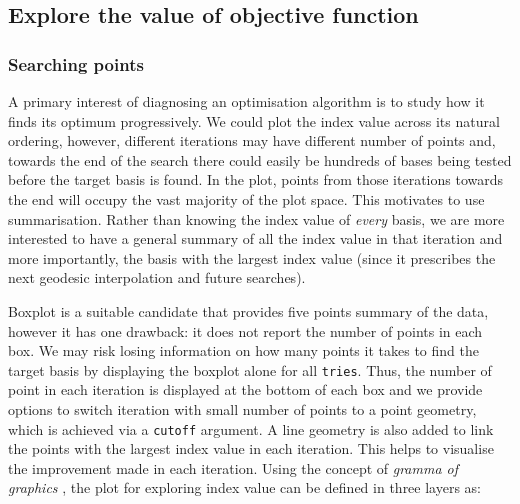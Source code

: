\documentclass[12pt]{article}
\begin{document}
\hypertarget{static}{%
\subsection{Explore the value of objective function}\label{static}}

\hypertarget{searching-points}{%
\subsubsection{Searching points}\label{searching-points}}

A primary interest of diagnosing an optimisation algorithm is to study
how it finds its optimum progressively. We could plot the index value
across its natural ordering, however, different iterations may have
different number of points and, towards the end of the search there
could easily be hundreds of bases being tested before the target basis
is found. In the plot, points from those iterations towards the end will
occupy the vast majority of the plot space. This motivates to use
summarisation. Rather than knowing the index value of \emph{every}
basis, we are more interested to have a general summary of all the index
value in that iteration and more importantly, the basis with the largest
index value (since it prescribes the next geodesic interpolation and
future searches).

Boxplot is a suitable candidate that provides five points summary of the
data, however it has one drawback: it does not report the number of
points in each box. We may risk losing information on how many points it
takes to find the target basis by displaying the boxplot alone for all
\texttt{tries}. Thus, the number of point in each iteration is displayed
at the bottom of each box and we provide options to switch iteration
with small number of points to a point geometry, which is achieved via a
\texttt{cutoff} argument. A line geometry is also added to link the
points with the largest index value in each iteration. This helps to
visualise the improvement made in each iteration. Using the concept of
\emph{gramma of graphics} \citep{wickham2010layered}, the plot for
exploring index value can be defined in three layers as:
\end{document}
